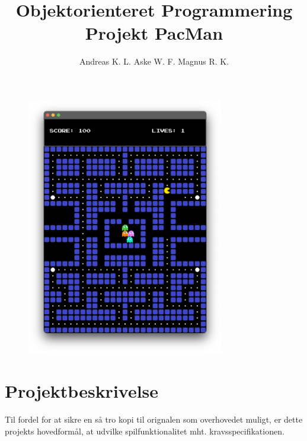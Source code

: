 \documentclass{article}
\title{\textbf{Objektorienteret Programmering Projekt PacMan}}
\author{Andreas K. L. \quad Aske W. F. \quad Magnus R. K.}
\theoremstyle{mytheoremstyle}
\theoremstyle{mytheoremstyle}
\theoremstyle{myproblemstyle}
\begin{document}
\begin{titlepage}
    \maketitle
    \begin{figure}[H]
        \begin{center}
            \includegraphics[width=0.77\textwidth]{figures/FrontPageImage.png}
        \end{center}
    \end{figure}
\end{titlepage}
    \clearpage
    \newpage
    \setcounter{page}{1}

    \pagestyle{fancy}

    \tableofcontents
    \newpage
\section{Projektbeskrivelse}\label{sec:Beskrivelse} %

Til fordel for at sikre en så tro kopi til orignalen som overhovedet muligt, er
dette projekts hovedformål, at udvilke spilfunktionalitet mht.
kravsspecifikationen. 
\end{document}
